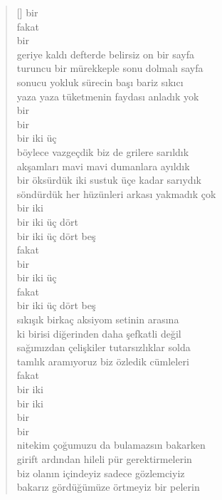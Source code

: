 \documentclass[10pt, openright, twoside]{memoir}
\theoremstyle{definition}
\begin{document}
\begin{verse}[\versewidth]
  bir \\
  fakat \\
  bir \\
  geriye kaldı defterde belirsiz on bir sayfa \\
  turuncu bir mürekkeple sonu dolmalı sayfa \\
  sonucu yokluk sürecin başı bariz sıkıcı \\
  yaza yaza tüketmenin faydası anladık yok \\
  bir \\
  bir \\
  bir iki üç \\
  böylece vazgeçdik biz de grilere sarıldık \\
  akşamları mavi mavi dumanlara ayıldık \\
  bir öksürdük iki sustuk üçe kadar sarıydık \\
  söndürdük her hüzünleri arkası yakmadık çok \\
  bir iki \\
  bir iki üç dört \\
  bir iki üç dört beş \\
  fakat \\
  bir \\
  bir iki üç \\
  fakat \\
  bir iki üç dört beş \\
  sıkışık birkaç aksiyom setinin arasına \\
  ki birisi diğerinden daha şefkatli değil \\
  sağımızdan çelişkiler tutarsızlıklar solda \\
  tamlık aramıyoruz biz özledik cümleleri \\
  fakat \\
  bir iki \\
  bir iki \\
  bir \\
  bir \\
  nitekim çoğumuzu da bulamazsın bakarken \\
  girift ardından hileli pür gerektirmelerin \\
  biz olanın içindeyiz sadece gözlemciyiz \\
  bakarız gördüğümüze örtmeyiz bir pelerin \\
\end{verse}
\vspace*{\fill}
%
\newpage
{}
\vspace*{\fill}
\end{document}
